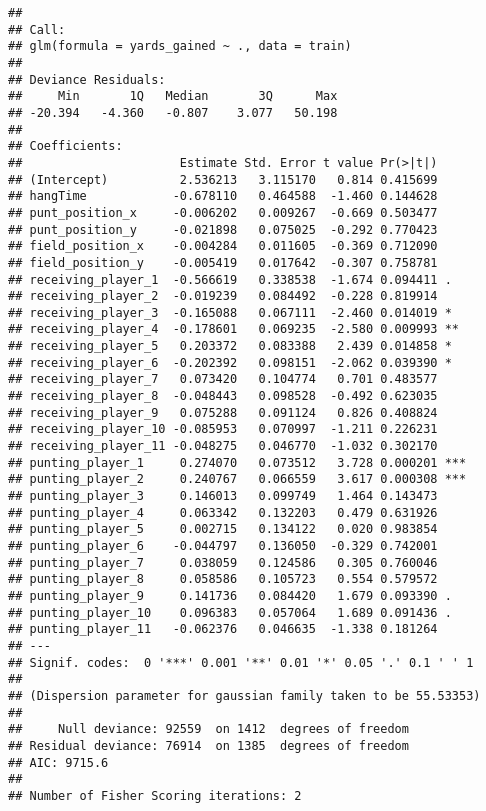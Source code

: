 \documentclass[
]{article}
\newenvironment{Shaded}{\begin{snugshade}}{\end{snugshade}}
\newcommand{\DecValTok}[1]{\textcolor[rgb]{0.00,0.00,0.81}{#1}}
\newcommand{\FunctionTok}[1]{\textcolor[rgb]{0.00,0.00,0.00}{#1}}
\newcommand{\NormalTok}[1]{#1}
\newcommand{\OtherTok}[1]{\textcolor[rgb]{0.56,0.35,0.01}{#1}}
\newcommand{\SpecialCharTok}[1]{\textcolor[rgb]{0.00,0.00,0.00}{#1}}
\begin{document}
\begin{verbatim}
## 
## Call:
## glm(formula = yards_gained ~ ., data = train)
## 
## Deviance Residuals: 
##     Min       1Q   Median       3Q      Max  
## -20.394   -4.360   -0.807    3.077   50.198  
## 
## Coefficients:
##                      Estimate Std. Error t value Pr(>|t|)    
## (Intercept)          2.536213   3.115170   0.814 0.415699    
## hangTime            -0.678110   0.464588  -1.460 0.144628    
## punt_position_x     -0.006202   0.009267  -0.669 0.503477    
## punt_position_y     -0.021898   0.075025  -0.292 0.770423    
## field_position_x    -0.004284   0.011605  -0.369 0.712090    
## field_position_y    -0.005419   0.017642  -0.307 0.758781    
## receiving_player_1  -0.566619   0.338538  -1.674 0.094411 .  
## receiving_player_2  -0.019239   0.084492  -0.228 0.819914    
## receiving_player_3  -0.165088   0.067111  -2.460 0.014019 *  
## receiving_player_4  -0.178601   0.069235  -2.580 0.009993 ** 
## receiving_player_5   0.203372   0.083388   2.439 0.014858 *  
## receiving_player_6  -0.202392   0.098151  -2.062 0.039390 *  
## receiving_player_7   0.073420   0.104774   0.701 0.483577    
## receiving_player_8  -0.048443   0.098528  -0.492 0.623035    
## receiving_player_9   0.075288   0.091124   0.826 0.408824    
## receiving_player_10 -0.085953   0.070997  -1.211 0.226231    
## receiving_player_11 -0.048275   0.046770  -1.032 0.302170    
## punting_player_1     0.274070   0.073512   3.728 0.000201 ***
## punting_player_2     0.240767   0.066559   3.617 0.000308 ***
## punting_player_3     0.146013   0.099749   1.464 0.143473    
## punting_player_4     0.063342   0.132203   0.479 0.631926    
## punting_player_5     0.002715   0.134122   0.020 0.983854    
## punting_player_6    -0.044797   0.136050  -0.329 0.742001    
## punting_player_7     0.038059   0.124586   0.305 0.760046    
## punting_player_8     0.058586   0.105723   0.554 0.579572    
## punting_player_9     0.141736   0.084420   1.679 0.093390 .  
## punting_player_10    0.096383   0.057064   1.689 0.091436 .  
## punting_player_11   -0.062376   0.046635  -1.338 0.181264    
## ---
## Signif. codes:  0 '***' 0.001 '**' 0.01 '*' 0.05 '.' 0.1 ' ' 1
## 
## (Dispersion parameter for gaussian family taken to be 55.53353)
## 
##     Null deviance: 92559  on 1412  degrees of freedom
## Residual deviance: 76914  on 1385  degrees of freedom
## AIC: 9715.6
## 
## Number of Fisher Scoring iterations: 2
\end{verbatim}

\begin{Shaded}
\end{Shaded}
\end{document}
